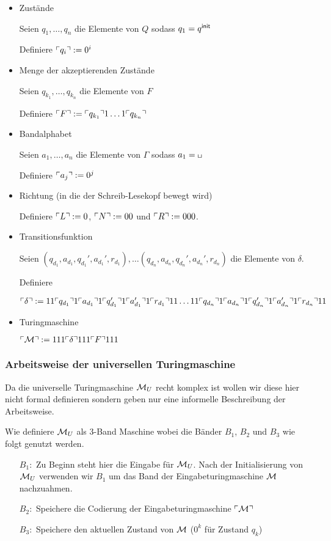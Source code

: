\begin{itemize}
 \item Zustände
 
    Seien $q_1,\dots, q_{n}$ die Elemente von $Q$ sodass $q_1=q^\mathsf{init}$ 
    
    Definiere $\ulcorner q_i \urcorner:=0^i$
    
  \item Menge der akzeptierenden Zustände
  
    Seien $q_{k_1},\dots, q_{k_n}$ die Elemente von $F$
    
    Definiere $\ulcorner F \urcorner:=\ulcorner q_{k_1} \urcorner 1 \ldots 1 \ulcorner q_{k_n} \urcorner$
    
  \item Bandalphabet
  
    Seien $a_1,\dots, a_{n}$ die Elemente von $\Gamma$ sodass $a_1=\blank$
    
    Definiere $\ulcorner a_j \urcorner:=0^j$
    
  \item Richtung (in die der Schreib-Lesekopf bewegt wird)
  
    Definiere $\ulcorner L \urcorner:=0$, $\ulcorner N \urcorner:=00$ und $\ulcorner R \urcorner:=000$.
    
  \item Transitionsfunktion
  
   Seien $(q_{d_1}, a_{d_1}, q_{d_1}', a_{d_1}', r_{d_1}),\dots (q_{d_n}, a_{d_n}, q_{d_n}', a_{d_n}', r_{d_n})$ die Elemente von $\delta$.
  
   Definiere 
   
   $\ulcorner \delta \urcorner:= 11\ulcorner q_{d_1} \urcorner1\ulcorner a_{d_1} \urcorner1\ulcorner q_{d_1}' \urcorner1\ulcorner a_{d_1}' \urcorner1\ulcorner r_{d_1} \urcorner11\dots 11 \ulcorner q_{d_n} \urcorner1\ulcorner a_{d_n} \urcorner1\ulcorner q_{d_n}' \urcorner1 \ulcorner a_{d_n}' \urcorner1\ulcorner r_{d_n} \urcorner11$
   
   \item Turingmaschine
   
   $\ulcorner \mathcal{M} \urcorner:=111\ulcorner \delta \urcorner111\ulcorner F \urcorner111$
\end{itemize}


\subsubsection{Arbeitsweise der universellen Turingmaschine}
Da die universelle Turingmaschine $\mathcal{M}_U$ recht komplex ist wollen wir diese hier nicht formal definieren sondern geben nur eine informelle Beschreibung der Arbeitsweise.


Wie definiere $\mathcal{M}_U$ als 3-Band Maschine wobei die Bänder $B_1$, $B_2$ und $B_3$ wie folgt genutzt werden.
\begin{itemize}
\item[$B_1:$] Zu Beginn steht hier die Eingabe für $\mathcal{M}_U$.
Nach der Initialisierung von $\mathcal{M}_U$ verwenden wir $B_1$ um das Band der Eingabeturingmaschine $\mathcal{M}$ nachzuahmen.
\item[$B_2:$] Speichere die Codierung der Eingabeturingmaschine $\ulcorner \mathcal{M} \urcorner$
\item[$B_3:$] Speichere den aktuellen Zustand von $\mathcal{M}$ ($0^k$ für Zustand $q_k$)
\end{itemize}

